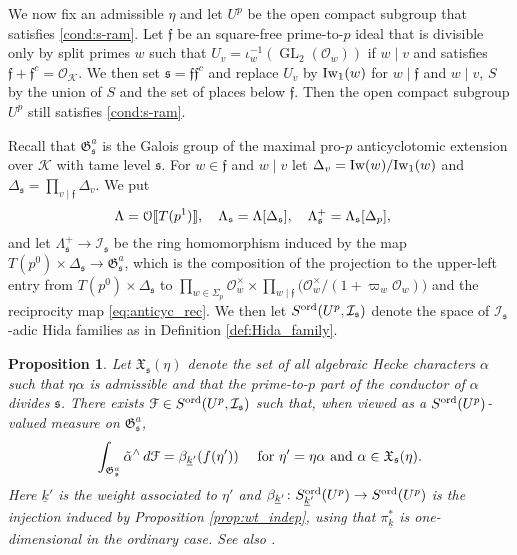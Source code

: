 \documentclass[leqno]{amsart}
\newtheorem{prop}[thm]{Proposition}
\theoremstyle{definition}
\theoremstyle{remark}
\newcommand{\oo}{\mathcal{O}}
\newcommand{\eo}{\EuScript{O}}
\DeclareMathOperator{\GL}{GL}
\newcommand{\ff}{\mathfrak{f}}
\newcommand{\fs}{\mathfrak{s}}
\newcommand{\K}{{\mathcal{K}}} %
\newcommand{\fG}{\mathfrak{G}}
\newcommand{\fX}{\mathfrak{X}}
\newcommand{\wt}[1]{\underline{ #1 }}
\newcommand{\Iw}{\textnormal{Iw}} %
\newcommand{\euF}{\EuScript{F}} %
\newcommand{\I}{\mathcal{I}} %
\newcommand{\ord}{\textnormal{ord}} %
\begin{document}
We now fix an admissible $\eta$
and let $U^p$ be the open compact subgroup 
that satisfies \eqref{cond:s-ram}.
Let $\ff$ be an square-free prime-to-$p$ ideal that is divisible
only by split primes $w$ such that $U_v=\iota_w^{-1}(\GL_2(\oo_w))$
if $w\mid v$ and satisfies $\ff+\ff^c=\oo_\K$.
We then set $\fs=\ff\ff^c$
and replace $U_v$ by $\Iw_1(w)$ for $w\mid \ff$ and $w\mid v$,
$S$ by the union of $S$ and the set of places below $\ff$.
Then the open compact subgroup $U^p$ still satisfies \eqref{cond:s-ram}.

Recall that $\fG_\fs^a$
is the Galois group of the maximal pro-$p$
anticyclotomic extension over $\K$ with tame level $\fs$.
For $w\in \ff$ and $w\mid v$
let $\Delta_v=\Iw(w)/\Iw_1(w)$
and $\Delta_{\fs}=\prod_{v\mid \ff}\Delta_v$.
We put 
\[
\Lambda=\eo\llbracket T(p^1)\rrbracket,\quad
\Lambda_\fs=\Lambda[\Delta_\fs],\quad
\Lambda_\fs^+=\Lambda_\fs[\Delta_p],\quad
\]
and let $\Lambda^+_\fs\to \I_\fs$
be the ring homomorphism induced by 
the map $T(p^0)\times \Delta_{\fs}\to \fG_\fs^a$,
which is the composition of
the projection to the upper-left entry
from $T(p^0)\times \Delta_{\fs}$ to 
$\prod_{w\in \Sigma_p}\oo_w^\times\times 
\prod_{w\mid \ff}\big(\oo_w^\times/(1+\varpi_w\oo_w)\big)$
and the reciprocity map \eqref{eq:anticyc_rec}.
We then let $S^{\ord}(U^p,\I_\fs)$ 
denote the space of $\I_\fs$-adic Hida families
as in Definition \ref{def:Hida_family}.

\begin{prop}\cite[Thm. 7.6]{lee}\label{prop:family}
Let $\fX_\fs(\eta)$ denote the set of all
algebraic Hecke characters $\alpha$ such that 
$\eta\alpha$ is admissible 
and that the prime-to-$p$ part of the conductor
of $\alpha$ divides $\fs$.
    There exists 
    $\euF\in S^{\ord}(U^p, \I_\fs)$ such that,
    when viewed as a $S^{\ord}(U^p)$-valued measure on $\fG_\fs^a$,
    \[
    \int_{\fG_\fs^a} \tilde{\alpha}^\wedge\,d\euF
    =\beta_{\wt{k}'}(f(\eta'))\quad\text{ for }
    \eta'=\eta\alpha\text{ and }
    \alpha\in \fX_\fs(\eta).
    \]
    Here $\wt{k}'$ is the weight associated to $\eta'$
    and $\beta_{\wt{k}'}\colon 
    S^{\ord}_{\wt{k}'}(U^p)\to S^{\ord}(U^p)$
    is the injection induced by Proposition \ref{prop:wt_indep},
    using that $\pi_{\wt{k}}^*$ is one-dimensional in the ordinary case.
    See also \cite[Prop 2.22]{ger}.
\end{prop}
\end{document}
